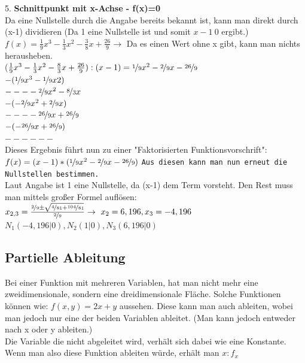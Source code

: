 \documentclass{article}
\begin{document}
	5. \textbf{Schnittpunkt mit x-Achse - f(x)=0} \\
	Da eine Nullstelle durch die Angabe bereits bekannt ist, kann man direkt durch (x-1) dividieren (Da 1 eine Nullstelle ist und somit $x - 1\ 0$ ergibt.)
	$f(x)=\frac{1}{9}x^3-\frac{1}{3}x^2-\frac{3}{8}x+\frac{26}{9}\to $ Da es einen Wert ohne x gibt, kann man nichts herausheben. \\
	($\frac{1}{9}x^3-\frac{1}{3}x^2-\frac{8}{3}x+\frac{26}{9}):(x-1)=\nicefrac{1}{9}x^2 -\nicefrac{2}{9}x-\nicefrac{26}{9}$\\
	$-(\nicefrac{1}{9}x^3-\nicefrac{1}{9}x2)$ \\
	$--- -\nicefrac{2}{9}x^2-\nicefrac{8}{3}x$ \\
	$-(-\nicefrac{2}{9}x^2+\nicefrac{2}{9}x)$ \\
	$--- -\nicefrac{26}{9}x+\nicefrac{26}{9}$ \\
  $-(-\nicefrac{26}{9}x+\nicefrac{26}{9})$ \\
	$--- ---$ \\
	Dieses Ergebnis führt nun zu einer "Faktorisierten Funktionsvorschrift": \\
	$f(x)=(x-1)*(\nicefrac{1}{9}x^2-\nicefrac{2}{9}x-\nicefrac{26}{9})$ \verb|Aus diesen kann man nun erneut die Nullstellen bestimmen.| \\
	Laut Angabe ist 1 eine Nullstelle, da (x-1) dem Term vorsteht. Den Rest muss man mittels großer Formel auflösen: \\
	$x_{2,3}=\frac{\nicefrac{2}{9}\pm\sqrt{\nicefrac{4}{81}+\nicefrac{104}{81}}}{\nicefrac{2}{9}}\to\ x_2=6,196, x_3=-4,196$ \\
	$N_1(-4,196|0), N_2(1|0), N_3(6,196|0)$
	\subsection{Partielle Ableitung}
	Bei einer Funktion mit mehreren Variablen, hat man nicht mehr eine zweidimensionale, sondern eine dreidimensionale Fläche. Solche Funktionen können wie: $f(x,y)=2x+y$ aussehen. Diese kann man auch ableiten, wobei man jedoch nur eine der beiden Variablen ableitet. (Man kann jedoch entweder nach x oder y ableiten.) \\
	Die Variable die nicht abgeleitet wird, verhält sich dabei wie eine Konstante. \\
	Wenn man also diese Funktion ableiten würde, erhält man $x:f_x$
\end{document}
